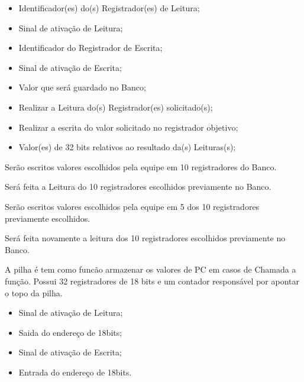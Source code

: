 \documentclass{article}
\begin{document}
  	\begin{itemize}
     \item Identificador(es) do(s) Registrador(es) de Leitura;
     \item Sinal de ativação de Leitura;
     \item Identificador do Registrador de Escrita;
     \item Sinal de ativação de Escrita;
     \item Valor que será guardado no Banco;
     \end{itemize}
    
  \actions
  \begin{itemize}
     \item Realizar a Leitura do(s) Registrador(es) solicitado(s);
     \item Realizar a escrita do valor solicitado no registrador objetivo;
    \end{itemize}
  
  \results
  	\begin{itemize}
     \item Valor(es) de 32 bits relativos ao resultado da(s) Leituras(s); 
    \end{itemize}
  
  \begin{mainflow}
     \item Serão escritos valores escolhidos pela equipe em 10 registradores do Banco.
     \item Será feita a Leitura do 10 registradores escolhidos previamente no Banco.
     \item Serão escritos valores escolhidos pela equipe em 5 dos 10 registradores previamente escolhidos.
     \item Será feita novamente a leitura dos 10 registradores escolhidos previamente no Banco.
  \end{mainflow}

A pilha é tem como funcão armazenar os valores de PC em casos de Chamada a função. Possui 32 registradores de 18 bits e um contador responsável por apontar o topo da pilha.
  
  	\begin{itemize}
     \item Sinal de ativação de Leitura;
     \item Saida do endereço de 18bits;
     \item Sinal de ativação de Escrita;
     \item Entrada do endereço de 18bits.
     \end{itemize}
    
\end{document}

